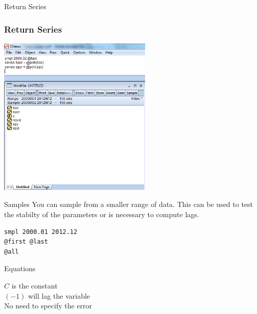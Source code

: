 \documentclass[14pt,xcolor=pdftex,dvipsnames,table]{beamer}\usepackage[]{graphicx}\usepackage[]{color}
\begin{document}
\begin{frame}{Return Series}
\graphicspath{{./Figures/}}
\frametitle{Return Series}
\begin{center}
\includegraphics[height = 3.0in]{Returncodefull}
\end{center}
\end{frame} 

\begin{frame}[fragile]{Samples}
You can sample from a smaller range of data.  This can be used to test the stabilty of the parameters or is necessary to compute lags. 
\begin{verbatim}
smpl 2000.01 2012.12
@first @last
@all
\end{verbatim}
\end{frame}

\begin{frame}{Equations}
\graphicspath{{./Figures/}}
\begin{center}
\end{center}

$C$ is the constant\\
$(-1)$ will lag the variable\\
No need to specify the error
\end{frame}
\end{document}
